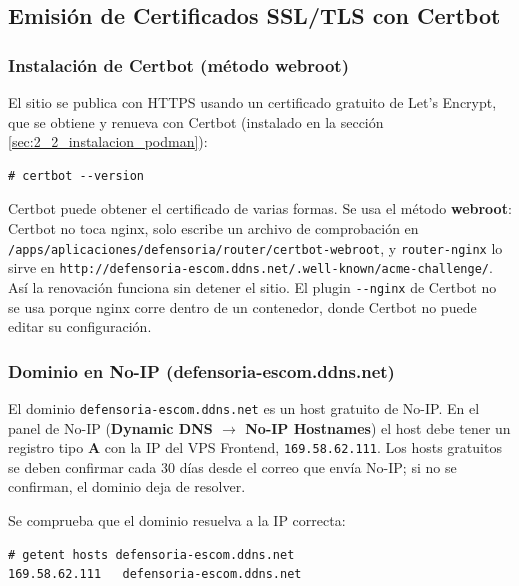 \subsection{Emisión de Certificados SSL/TLS con Certbot}\label{sec:7_3_certificados_certbot}

\subsubsection{Instalación de Certbot (método webroot)}
El sitio se publica con HTTPS usando un certificado gratuito de Let's Encrypt, que se obtiene y renueva con Certbot (instalado en la sección \ref{sec:2_2_instalacion_podman}):
\begin{lstlisting}
# certbot --version
\end{lstlisting}
Certbot puede obtener el certificado de varias formas. Se usa el método \textbf{webroot}: Certbot no toca nginx, solo escribe un archivo de comprobación en \nolinkurl{/apps/aplicaciones/defensoria/router/certbot-webroot}, y \texttt{router-nginx} lo sirve en \texttt{http://defensoria-escom.ddns.net/.well-known/acme-challenge/}. Así la renovación funciona sin detener el sitio. El plugin \texttt{-{}-nginx} de Certbot no se usa porque nginx corre dentro de un contenedor, donde Certbot no puede editar su configuración.

\subsubsection{Dominio en No-IP (defensoria-escom.ddns.net)}
El dominio \texttt{defensoria-escom.ddns.net} es un host gratuito de No-IP. En el panel de No-IP (\textbf{Dynamic DNS $\rightarrow$ No-IP Hostnames}) el host debe tener un registro tipo \textbf{A} con la IP del VPS Frontend, \texttt{169.58.62.111}. Los hosts gratuitos se deben confirmar cada 30 días desde el correo que envía No-IP; si no se confirman, el dominio deja de resolver.

Se comprueba que el dominio resuelva a la IP correcta:
\begin{lstlisting}
# getent hosts defensoria-escom.ddns.net
169.58.62.111   defensoria-escom.ddns.net
\end{lstlisting}

